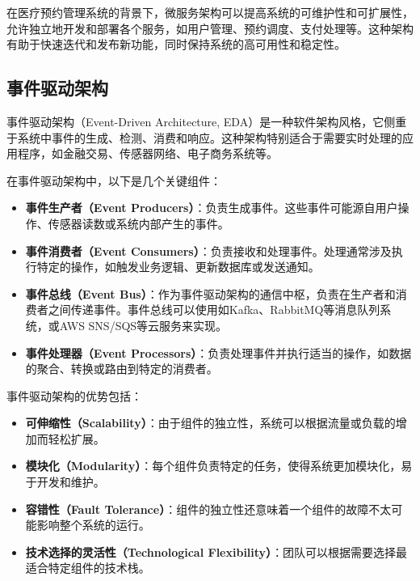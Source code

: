 在医疗预约管理系统的背景下，微服务架构可以提高系统的可维护性和可扩展性，允许独立地开发和部署各个服务，如用户管理、预约调度、支付处理等。这种架构有助于快速迭代和发布新功能，同时保持系统的高可用性和稳定性。

\subsection{事件驱动架构}
事件驱动架构（Event-Driven Architecture, EDA）是一种软件架构风格，它侧重于系统中事件的生成、检测、消费和响应。这种架构特别适合于需要实时处理的应用程序，如金融交易、传感器网络、电子商务系统等。

在事件驱动架构中，以下是几个关键组件：

\begin{itemize}
	\item \textbf{事件生产者（Event Producers）}：负责生成事件。这些事件可能源自用户操作、传感器读数或系统内部产生的事件。
	
	\item \textbf{事件消费者（Event Consumers）}：负责接收和处理事件。处理通常涉及执行特定的操作，如触发业务逻辑、更新数据库或发送通知。
	
	\item \textbf{事件总线（Event Bus）}：作为事件驱动架构的通信中枢，负责在生产者和消费者之间传递事件。事件总线可以使用如Kafka、RabbitMQ等消息队列系统，或AWS SNS/SQS等云服务来实现。
	
	\item \textbf{事件处理器（Event Processors）}：负责处理事件并执行适当的操作，如数据的聚合、转换或路由到特定的消费者。
\end{itemize}

事件驱动架构的优势包括：

\begin{itemize}
	\item \textbf{可伸缩性（Scalability）}：由于组件的独立性，系统可以根据流量或负载的增加而轻松扩展。
	
	\item \textbf{模块化（Modularity）}：每个组件负责特定的任务，使得系统更加模块化，易于开发和维护。
	
	\item \textbf{容错性（Fault Tolerance）}：组件的独立性还意味着一个组件的故障不太可能影响整个系统的运行。
	
	\item \textbf{技术选择的灵活性（Technological Flexibility）}：团队可以根据需要选择最适合特定组件的技术栈。
\end{itemize}

